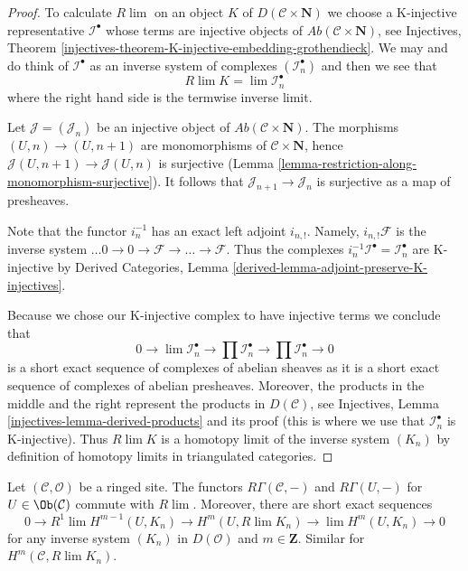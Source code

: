 \begin{proof}
To calculate $R\lim$ on an object $K$ of $D(\mathcal{C} \times \mathbf{N})$
we choose a K-injective representative $\mathcal{I}^\bullet$ whose terms are
injective objects of $\textit{Ab}(\mathcal{C} \times \mathbf{N})$, see
Injectives, Theorem
\ref{injectives-theorem-K-injective-embedding-grothendieck}.
We may and do think of $\mathcal{I}^\bullet$ as an inverse system of
complexes $(\mathcal{I}_n^\bullet)$ and then we see that
$$
R\lim K = \lim \mathcal{I}_n^\bullet
$$
where the right hand side is the termwise inverse limit.

\medskip\noindent
Let $\mathcal{J} = (\mathcal{J}_n)$ be an injective object of
$\textit{Ab}(\mathcal{C} \times \mathbf{N})$. The morphisms
$(U, n) \to (U, n + 1)$ are monomorphisms of
$\mathcal{C} \times \mathbf{N}$, hence
$\mathcal{J}(U, n + 1) \to \mathcal{J}(U, n)$ is surjective
(Lemma \ref{lemma-restriction-along-monomorphism-surjective}).
It follows that $\mathcal{J}_{n + 1} \to \mathcal{J}_n$ is
surjective as a map of presheaves.

\medskip\noindent
Note that the functor $i_n^{-1}$ has an exact left adjoint $i_{n, !}$.
Namely, $i_{n, !}\mathcal{F}$ is the inverse system
$\ldots 0 \to 0 \to \mathcal{F} \to \ldots \to \mathcal{F}$.
Thus the complexes $i_n^{-1}\mathcal{I}^\bullet = \mathcal{I}_n^\bullet$
are K-injective by
Derived Categories, Lemma \ref{derived-lemma-adjoint-preserve-K-injectives}.

\medskip\noindent
Because we chose our K-injective complex to have injective terms
we conclude that
$$
0 \to  \lim \mathcal{I}_n^\bullet \to \prod \mathcal{I}_n^\bullet
\to \prod \mathcal{I}_n^\bullet \to 0
$$
is a short exact sequence of complexes of abelian sheaves as it
is a short exact sequence of complexes of abelian presheaves.
Moreover, the products in the middle and the right represent
the products in $D(\mathcal{C})$, see
Injectives, Lemma \ref{injectives-lemma-derived-products} and its
proof (this is where we use that $\mathcal{I}_n^\bullet$ is K-injective).
Thus $R\lim K$ is a homotopy limit of the inverse system $(K_n)$
by definition of homotopy limits in triangulated categories.
\end{proof}

\begin{lemma}
\label{lemma-RGamma-commutes-with-Rlim}
Let $(\mathcal{C}, \mathcal{O})$ be a ringed site. The functors
$R\Gamma(\mathcal{C}, -)$ and $R\Gamma(U, -)$ for $U \in \Ob(\mathcal{C})$
commute with $R\lim$. Moreover, there are
short exact sequences
$$
0 \to
R^1\lim H^{m - 1}(U, K_n) \to H^m(U, R\lim K_n) \to
\lim H^m(U, K_n) \to 0
$$
for any inverse system $(K_n)$ in $D(\mathcal{O})$ and $m \in \mathbf{Z}$.
Similar for $H^m(\mathcal{C}, R\lim K_n)$.
\end{lemma}

